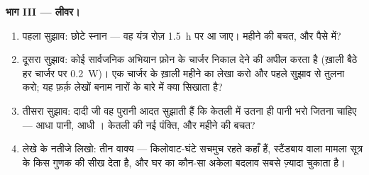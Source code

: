 \begin{problem}
\medskip\noindent\textbf{भाग III --- लीवर।}
\begin{enumerate}[resume]
  \item पहला सुझाव: छोटे स्नान --- वह यंत्र रोज़ \qty{1.5}{h} पर
        आ जाए। महीने की बचत,  और पैसे में?
  \item दूसरा सुझाव: कोई सार्वजनिक अभियान फ़ोन के चार्जर निकाल देने
        की अपील करता है (ख़ाली बैठे हर चार्जर पर \qty{0.2}{W})। एक
        चार्जर के ख़ाली महीने का लेखा करो और पहले सुझाव से तुलना करो;
        यह फ़र्क़ लेखों बनाम नारों के बारे में क्या सिखाता है?
  \item तीसरा सुझाव: दादी जी वह पुरानी आदत सुझाती हैं कि केतली में
        उतना ही पानी भरो जितना चाहिए --- आधा पानी, आधी । केतली
        की नई पंक्ति, और महीने की बचत?
  \item लेखे के नतीजे लिखो: तीन वाक्य --- किलोवाट-घंटे सचमुच रहते
        कहाँ हैं, स्टैंडबाय वाला मामला सूत्र के किस गुणक की सीख देता
        है, और घर का कौन-सा अकेला बदलाव सबसे ज़्यादा चुकाता है।
\end{enumerate}
\end{problem}
